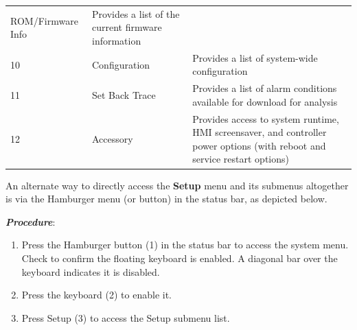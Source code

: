 \documentclass[11pt,twoside]{book}
\begin{document}
{{{{{{{{{{{{{{{{{{\begin{longtable}[]{@{}lll@{}}
\begin{minipage}[t]{0.23\columnwidth}
ROM/Firmware Info\strut
\end{minipage} & \begin{minipage}[t]{0.65\columnwidth}\raggedright
Provides a list of the current firmware information\strut
\end{minipage}\tabularnewline
\begin{minipage}[t]{0.04\columnwidth}\raggedright
10\strut
\end{minipage} & \begin{minipage}[t]{0.23\columnwidth}\raggedright
Configuration\strut
\end{minipage} & \begin{minipage}[t]{0.65\columnwidth}\raggedright
Provides a list of system-wide configuration\strut
\end{minipage}\tabularnewline
\begin{minipage}[t]{0.04\columnwidth}\raggedright
11\strut
\end{minipage} & \begin{minipage}[t]{0.23\columnwidth}\raggedright
Set Back Trace\strut
\end{minipage} & \begin{minipage}[t]{0.65\columnwidth}\raggedright
Provides a list of alarm conditions available for download for
analysis\strut
\end{minipage}\tabularnewline
\begin{minipage}[t]{0.04\columnwidth}\raggedright
12\strut
\end{minipage} & \begin{minipage}[t]{0.23\columnwidth}\raggedright
Accessory\strut
\end{minipage} & \begin{minipage}[t]{0.65\columnwidth}\raggedright
Provides access to system runtime, HMI screensaver, and controller power
options (with reboot and service restart options)\strut
\end{minipage}\tabularnewline
\bottomrule
\end{longtable}

An alternate way to directly access the \textbf{Setup} menu and its
submenus altogether is via the Hamburger menu (or button) in the status
bar, as depicted below.

\textbf{\emph{Procedure}}:

\begin{enumerate}
\def\labelenumi{\arabic{enumi}.}
\item
  Press the Hamburger button (1) in the status bar to access the system
  menu. Check to confirm the floating keyboard is enabled. A diagonal
  bar over the keyboard indicates it is disabled.
\item
  Press the keyboard (2) to enable it.
\item
  Press Setup (3) to access the Setup submenu list.


\end{enumerate}}}}}}}}}}}}}}}}}}}
\end{document}
